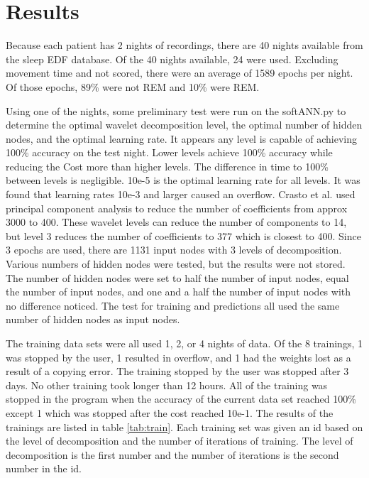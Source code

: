 \documentclass[12pt, oneside]{book}
\begin{document}
\section{\textbf{Results}}

Because each patient has 2 nights of recordings, there are 40 nights available from the sleep EDF database. Of the 40 nights available, 24 were used. Excluding movement time and not scored, there were an average of 1589 epochs per night. Of those epochs, 89\% were not REM and 10\% were REM.

Using one of the nights, some preliminary test were run on the softANN.py to determine the optimal wavelet decomposition level, the optimal number of hidden nodes, and the optimal learning rate. It appears any level is capable of achieving 100\% accuracy on the test night. Lower levels achieve 100\% accuracy while reducing the Cost more than higher levels. The difference in time to 100\% between levels is negligible. 10e-5 is the optimal learning rate for all levels. It was found that learning rates 10e-3 and larger caused an overflow. Crasto et al. \cite{crasto_wavelet_2017} used principal component analysis to reduce the number of coefficients from approx 3000 to 400. These wavelet levels can reduce the number of components to 14, but level 3 reduces the number of coefficients to 377 which is closest to 400. Since 3 epochs are used, there are 1131 input nodes with 3 levels of decomposition. Various numbers of hidden nodes were tested, but the results were not stored. The number of hidden nodes were set to half the number of input nodes, equal the number of input nodes, and one and a half the number of input nodes with no difference noticed. The test for training and predictions all used the same number of hidden nodes as input nodes. 

The training data sets were all used 1, 2, or 4 nights of data. Of the 8 trainings, 1 was stopped by the user, 1 resulted in overflow, and 1 had the weights lost as a result of a copying error. The training stopped by the user was stopped after 3 days. No other training took longer than 12 hours. All of the training was stopped in the program when the accuracy of the current data set reached 100\% except 1 which was stopped after the cost reached 10e-1. The results of the trainings are listed in table \ref{tab:train}. Each training set was given an id based on the level of decomposition and the number of iterations of training. The level of decomposition is the first number and the number of iterations is the second number in the id.
\end{document}
